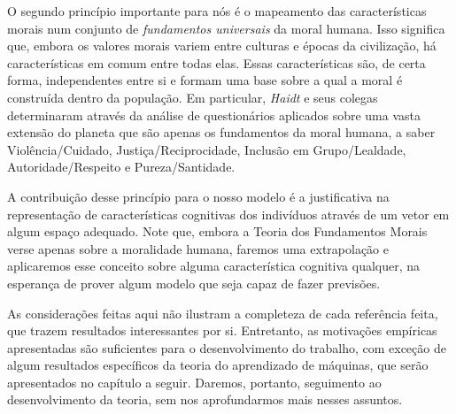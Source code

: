 O segundo princípio importante para nós é o mapeamento das características morais num conjunto de \emph{fundamentos universais} da moral humana.
Isso significa que, embora os valores morais variem entre culturas e épocas da civilização, há características em comum entre todas elas.
Essas características são, de certa forma, independentes entre si e formam uma base sobre a qual a moral é construída dentro da população.
Em particular, \emph{Haidt} e seus colegas determinaram através da análise de questionários aplicados sobre uma vasta extensão do planeta que são apenas os fundamentos da moral humana, a saber Violência/Cuidado, Justiça/Reciprocidade, Inclusão em Grupo/Lealdade, Autoridade/Respeito e Pureza/Santidade.

A contribuição desse princípio para o nosso modelo é a justificativa na representação de características cognitivas dos indivíduos através de um vetor em algum espaço adequado.
Note que, embora a Teoria dos Fundamentos Morais verse apenas sobre a moralidade humana, faremos uma extrapolação e aplicaremos esse conceito sobre alguma característica cognitiva qualquer, na esperança de prover algum modelo que seja capaz de fazer previsões.

As considerações feitas aqui não ilustram a completeza de cada  referência feita, que trazem resultados interessantes por si.
Entretanto, as motivações empíricas apresentadas são suficientes para o desenvolvimento do trabalho, com exceção de algum resultados específicos da teoria do aprendizado de máquinas, que serão apresentados no capítulo a seguir.
Daremos, portanto, seguimento ao desenvolvimento da teoria, sem nos aprofundarmos mais nesses assuntos.
